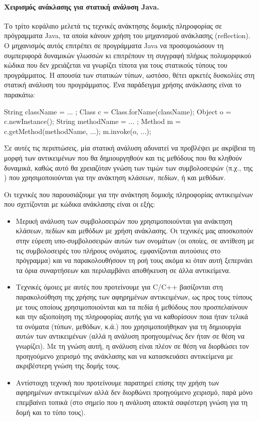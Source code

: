 \paragraph*{Χειρισμός ανάκλασης για στατική ανάλυση {\en Java}.}
Το τρίτο κεφάλαιο μελετά τις τεχνικές ανάκτησης δομικής πληροφορίας σε
πρόγραμματα {\en Java}, τα οποία κάνουν χρήση του μηχανισμού ανάκλασης
({\en reflection}).  Ο μηχανισμός αυτός επιτρέπει σε προγράμματα {\en
  Java} να προσομοιώσουν τη συμπεριφορά δυναμικών γλωσσών κι
επιτρέπουν τη συγγραφή πλήρως πολυμορφικού κώδικα που δεν χρειάζεται
να γνωρίζει τίποτα για τους στατικούς τύπους του προγράμματος. Η
απουσία των στατικών τύπων, ωστόσο, θέτει αρκετές δυσκολίες στη
στατική ανάλυση του προγράμματος. Ένα παράδειγμα χρήσης ανάκλασης
είναι το παρακάτω:
{\en
  \begin{javacodelinum}
    String className = ... ;
    Class c = Class.forName(className);
    Object o = c.newInstance();
    String methodName = ... ;
    Method m = c.getMethod(methodName, ...);
    m.invoke(o, ...);
  \end{javacodelinum}
}

Σε αυτές τις περιπτώσεις, μία στατική ανάλυση αδυνατεί να προβλέψει με
ακρίβεια τη μορφή των αντικειμένων που θα δημιουργηθούν και τις μεθόδους
που θα κληθούν δυναμικά, καθώς αυτό θα χρειαζόταν γνώση των τιμών των
συμβολοσειρών (π.χ., της {\en {}}) που χρησιμοποιούνται
για την ανάκτηση κλάσεων, πεδίων, ή και μεθόδων.

Οι τεχνικές που παρουσιάζουμε για την ανάκτηση δομικής πληροφορίας
αντικειμένων που σχετίζονται με κώδικα ανάκλασης είναι οι εξής:
\begin{itemize}
\item Μερική ανάλυση των συμβολοσειρών που χρησιμοποιούνται για
  ανάκτηση κλάσεων, πεδίων και μεθόδων με χρήση ανάκλασης. Οι τεχνικές
  μας αποσκοπούν στην εύρεση υπο-συμβολοσειρών αυτών των ονομάτων (οι
  οποίες, σε αντίθεση με τις συμβολοσειρές του πλήρους ονόματος,
  εμφανίζονται αυτούσιες στο πρόγραμμα) και να παρακολουθήσουν τη ροή
  τους ακόμα κι όταν αυτή ξεπερνάει τα όρια συναρτήσεων και
  περιλαμβάνει αποθήκευση σε άλλα αντικείμενα.
\item Τεχνικές όμοιες με αυτές που προτείνουμε για {\en C/C++}
  βασίζονται στη παρακολούθηση της χρήσης των αφηρημένων αντικειμένων,
  ως προς τους τύπους με τους οποίους χρησιμοποιούνται και τα πεδία ή
  μεθόδους που προσπελαύνουν και την αξιοποίηση της πληροφορίας αυτής
  για να καθορίσουν ποια ήταν τελικά τα ονόματα (τύπων, μεθόδων, κ.ά.)
  που χρησιμοποιήθηκαν για τη δημιουργία αυτών των αντικειμένων (αλλά
  η ανάλυση προηγουμένως δεν ήταν σε θέση να γνωρίζει). Με τη γνώση
  αυτή, η ανάλυση είναι πλέον σε θέση να διορθώσει τον προηγούμενο
  χειρισμό της ανάκλασης και να κατασκευάσει αντικείμενα με
  ακριβέστερη γνώση της δομής τους.
\item Αντίστοιχη τεχνική που προτείνουμε παρατηρεί επίσης την χρήση
  των αφηρημένων αντικειμένων αλλά δεν διορθώνει προηγούμενο χειρισμό,
  παρά μόνο επεμβαίνει τοπικά (στο σημείο που η ανάλυση αποκτά
  σαφέστερη γνώση για τη δομή και το τύπο τους).
\end{itemize}

